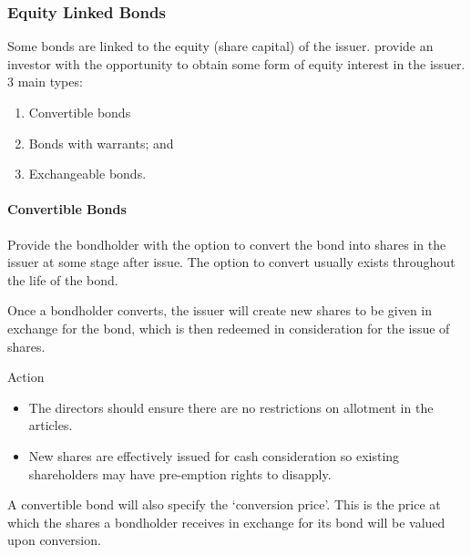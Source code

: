 \documentclass[
]{article}
\providecommand{\tightlist}{%
  \setlength{\itemsep}{0pt}\setlength{\parskip}{0pt}}
\newenvironment{env-02bd7092-3a62-48e4-8d01-dc71013a2f49}
{
    \savenotes\tcolorbox[blanker,breakable,left=5pt,borderline west={2pt}{-4pt}{aquamarine}]
}
{
    \endtcolorbox\spewnotes
}
\begin{document}
\hypertarget{equity-linked-bonds}{%
\subsubsection{Equity Linked Bonds}\label{equity-linked-bonds}}

Some bonds are linked to the equity (share capital) of the issuer.
provide an investor with the opportunity to obtain some form of equity
interest in the issuer. 3 main types:

\begin{enumerate}
\tightlist
\item
  Convertible bonds
\item
  Bonds with warrants; and
\item
  Exchangeable bonds.
\end{enumerate}

\hypertarget{convertible-bonds}{%
\paragraph{Convertible Bonds}\label{convertible-bonds}}

Provide the bondholder with the option to convert the bond into shares
in the issuer at some stage after issue. The option to convert usually
exists throughout the life of the bond.

Once a bondholder converts, the issuer will create new shares to be
given in exchange for the bond, which is then redeemed in consideration
for the issue of shares.

\begin{env-02bd7092-3a62-48e4-8d01-dc71013a2f49}

Action

\begin{itemize}
\tightlist
\item
  The directors should ensure there are no restrictions on allotment in
  the articles.
\item
  New shares are effectively issued for cash consideration so existing
  shareholders may have pre-emption rights to disapply.
\end{itemize}

\end{env-02bd7092-3a62-48e4-8d01-dc71013a2f49}

A convertible bond will also specify the `conversion price'. This is the
price at which the shares a bondholder receives in exchange for its bond
will be valued upon conversion.
\end{document}
